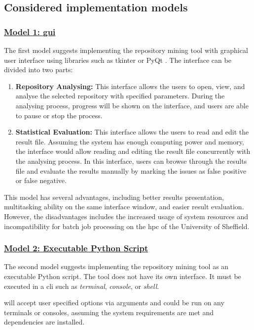 \documentclass[12pt, a4paper]{report}
\begin{document}
\subsection{Considered implementation models}

\subsubsection*{\underline{Model 1: \acrfull{gui}}} \label{subsec:model1}
The first model suggests implementing the repository mining tool with graphical user interface using
libraries such as tkinter \cite{tkinter} or PyQt \cite{pyqt}. The interface can be divided into two
parts:
\begin{enumerate}
  \item \textbf{Repository Analysing:} This interface allows the users to open, view, and
  analyse the selected repository with specified parameters. During the analysing process, progress
  will be shown on the interface, and users are able to pause or stop the process.
  \item \textbf{Statistical Evaluation:} This interface allows the users to read and edit the result
  file. Assuming the system has enough computing power and memory, the interface would allow reading
  and editing the result file concurrently with the analysing process. In this interface, users can
  browse through the results file and evaluate the results manually by marking the issues as false
  positive or false negative.
\end{enumerate}

This model has several advantages, including better results presentation, multitasking ability on
the same interface window, and easier result evaluation. However, the disadvantages includes the
increased usage of system resources and incompatibility for batch job processing on the
\acrfull{hpc} of the University of Sheffield.

\subsubsection*{\underline{Model 2: Executable Python Script}}\label{subsec:model2}
The second model suggests implementing the repository mining tool as an executable Python script.
The tool does not have its own interface. It must be executed in a \acrfull{cli} such as
\textit{terminal}, \textit{console}, or \textit{shell}.

will accept user specified options via
arguments and could be run on any terminals or consoles, assuming the system requirements are met
and dependencies are installed.
\end{document}
